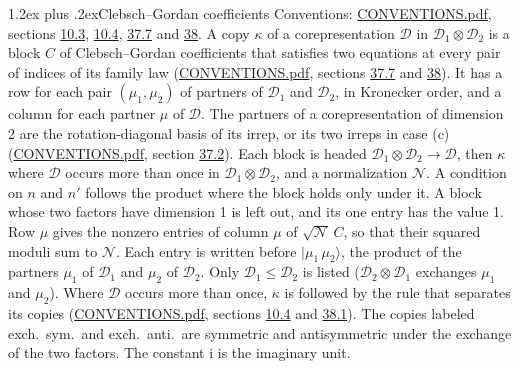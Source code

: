 \documentclass[10pt,a4paper]{article}
\makeatletter
\renewcommand\section{\@startsection{section}{1}{\z@}{-3ex plus -1ex minus -.2ex}%
  {1.2ex plus .2ex}{\normalfont\large\sffamily\bfseries\color{parttitle}}}
\numberwithin{equation}{section}
\newcommand{\iunit}{\mathrm{i}}
\newcommand{\irrprod}{\otimes}
\newcommand{\mult}{\kappa}
\newcommand{\intx}{\mu}
\newcommand{\cgnorm}{\mathcal{N}}
\newcommand{\prodket}[2]{\lvert {#1}\,{#2}\rangle}
\makeatother
\begin{document}
\section{Clebsch--Gordan coefficients}\label{s:clebsch_gordan}
Conventions: \href{../../CONVENTIONS.pdf}{CONVENTIONS.pdf}, sections \href{../../../rotation/CONVENTIONS.pdf\#conv.10.3}{10.3}, \href{../../../rotation/CONVENTIONS.pdf\#conv.10.4}{10.4}, \href{../../CONVENTIONS.pdf\#conv.37.7}{37.7} and \href{../../CONVENTIONS.pdf\#conv.38}{38}.
\leavevmode\label{n:matrix.corep.factors}\label{n:index.copy}\label{n:matrix.cg.stored}A copy $\mult$ of a corepresentation $\mathcal{D}$ in $\mathcal{D}_1\irrprod\mathcal{D}_2$ is a block $C$ of Clebsch--Gordan coefficients that satisfies two equations at every pair of indices of its family law (\href{../../CONVENTIONS.pdf}{CONVENTIONS.pdf}, sections \href{../../CONVENTIONS.pdf\#conv.37.7}{37.7} and \href{../../CONVENTIONS.pdf\#conv.38}{38}). \label{n:index.cg}It has a row for each pair $(\intx_1, \intx_2)$ of partners of $\mathcal{D}_1$ and $\mathcal{D}_2$, in Kronecker order, and a column for each partner $\intx$ of $\mathcal{D}$.
The partners of a corepresentation of dimension 2 are the rotation-diagonal basis of its irrep, or its two irreps in case (c) (\href{../../CONVENTIONS.pdf}{CONVENTIONS.pdf}, section \href{../../CONVENTIONS.pdf\#conv.37.2}{37.2}).
Each block is headed $\mathcal{D}_1\irrprod\mathcal{D}_2\to\mathcal{D}$, then $\mult$ where $\mathcal{D}$ occurs more than once in $\mathcal{D}_1\irrprod\mathcal{D}_2$, and a normalization $\cgnorm$. A condition on $n$ and $n'$ follows the product where the block holds only under it. A block whose two factors have dimension 1 is left out, and its one entry has the value 1. Row $\intx$ gives the nonzero entries of column $\intx$ of $\sqrt{\cgnorm}\,C$, so that their squared moduli sum to $\cgnorm$. \label{n:vector.ket.product}Each entry is written before $\prodket{\intx_1}{\intx_2}$, the product of the partners $\intx_1$ of $\mathcal{D}_1$ and $\intx_2$ of $\mathcal{D}_2$. Only $\mathcal{D}_1 \le \mathcal{D}_2$ is listed ($\mathcal{D}_2\irrprod\mathcal{D}_1$ exchanges $\intx_1$ and $\intx_2$).
Where $\mathcal{D}$ occurs more than once, $\mult$ is followed by the rule that separates its copies (\href{../../CONVENTIONS.pdf}{CONVENTIONS.pdf}, sections \href{../../../rotation/CONVENTIONS.pdf\#conv.10.4}{10.4} and \href{../../CONVENTIONS.pdf\#conv.38.1}{38.1}). \label{n:abbreviation.exchange}The copies labeled exch.\ sym.\ and exch.\ anti.\ are symmetric and antisymmetric under the exchange of the two factors.
The constant $\iunit$ is the imaginary unit.
\end{document}
